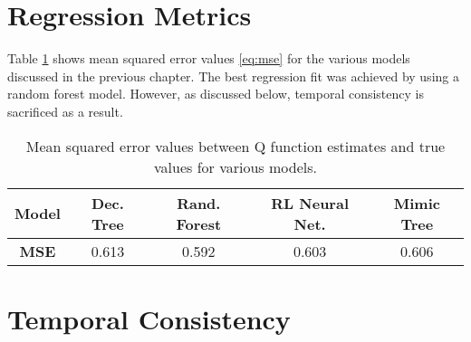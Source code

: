 \documentclass{sfuthesis}
\begin{document}
	\section{Regression Metrics}
	Table \ref{tab:mse-models} shows mean squared error values \eqref{eq:mse} for the various models discussed in the previous chapter. The best regression fit was achieved by using a random forest model. However, as discussed below, temporal consistency is sacrificed as a result.
	\begin{table}[ht]
		\centering
		\begin{tabular}{c|cccc}
			\textbf{Model} & Dec. Tree & Rand. Forest & RL Neural Net. & Mimic Tree \\ \hline
			\textbf{MSE}   & 0.613     & 0.592        & 0.603          & 0.606     
		\end{tabular}
		\caption{Mean squared error values between Q function estimates and true values for various models.}
		\label{tab:mse-models}
	\end{table}

	\section{Temporal Consistency}
	
\end{document}
